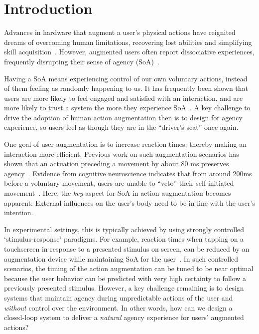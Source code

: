 \section{Introduction}
Advances in hardware that augment a user's physical actions have reignited dreams of overcoming human limitations, recovering lost abilities and simplifying skill acquisition~\citep{Goto2020-mw}. However, augmented users often report dissociative experiences, frequently disrupting their sense of agency (SoA)~\citep{Gilbert2017-ze, Gilbert2019-uc}.

Having a SoA means experiencing control of our own voluntary actions, instead of them feeling as randomly happening to us. It has frequently been shown that users are more likely to feel engaged and satisfied with an interaction, and are more likely to trust a system the more they experience SoA~\citep{Berberian2012-do, Miller2007-rb}. A key challenge to drive the adoption of human action augmentation then is to design for agency experience, so users feel as though they are in the ``driver's seat'' once again.

One goal of user augmentation is to increase reaction times, thereby making an interaction more efficient. Previous work on such augmentation scenarios has shown that an actuation preceding a movement by about 80 ms preserves agency~\cite{Kasahara2019-sk}. Evidence from cognitive neuroscience indicates that from around 200ms before a voluntary movement, users are unable to ``veto'' their self-initiated movement~\cite{Schultze-Kraft2016-bx}. Here, the \textit{key} aspect for SoA in action augmentation becomes apparent: External influences on the user's body need to be in line with the user's intention. 

In experimental settings, this is typically achieved by using strongly controlled `stimulus-response' paradigms. For example, reaction times when tapping on a touchscreen in response to a presented stimulus on screen, can be reduced by an augmentation device while maintaining SoA for the user~\cite{Kasahara2019-sk, Kasahara2021-gy}. In such controlled scenarios, the timing of the action augmentation can be tuned to be near optimal because the user behavior can be predicted with very high certainty to follow a previously presented stimulus. However, a key challenge remaining is to design systems that maintain agency during unpredictable actions of the user and \textit{without} control over the environment. In other words, how can we design a closed-loop system to deliver a \textit{natural} agency experience for users' augmented actions?

